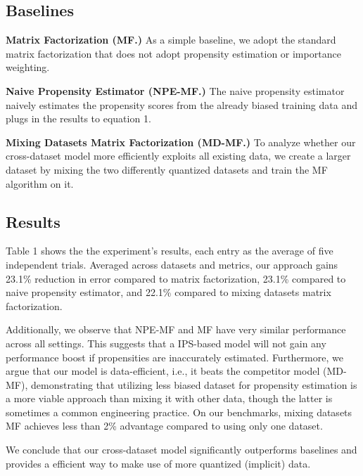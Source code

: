 \documentclass{article}
\begin{document}
\subsection{Baselines}
\textbf{Matrix Factorization (MF.)}
As a simple baseline, we adopt the standard matrix factorization that does not adopt propensity estimation or importance weighting.

\textbf{Naive Propensity Estimator (NPE-MF.)}
The naive propensity estimator naively estimates the propensity scores from the already biased training data and plugs in the results to equation 1.

\textbf{Mixing Datasets Matrix Factorization (MD-MF.)}
To analyze whether our cross-dataset model more efficiently exploits all existing data, we create a larger dataset by mixing the two differently quantized datasets and train the MF algorithm on it.

\subsection{Results}
Table 1 shows the the experiment's results, each entry as the average of five independent trials. Averaged across datasets and metrics, our approach gains 23.1\% reduction in error compared to matrix factorization, 23.1\% compared to naive propensity estimator, and 22.1\% compared to mixing datasets matrix factorization. 

Additionally, we observe that NPE-MF and MF have very similar performance across all settings. This suggests that a IPS-based model will not gain any performance boost if propensities are inaccurately estimated. Furthermore, we argue that our model is data-efficient, i.e., it beats the competitor model (MD-MF), demonstrating that utilizing less biased dataset for propensity estimation is a more viable approach than mixing it with other data, though the latter is sometimes a common engineering practice. On our benchmarks, mixing datasets MF achieves less than 2\% advantage compared to using only one dataset.

We conclude that our cross-dataset model significantly outperforms baselines and provides a efficient way to make use of more quantized (implicit) data. 
\end{document}
